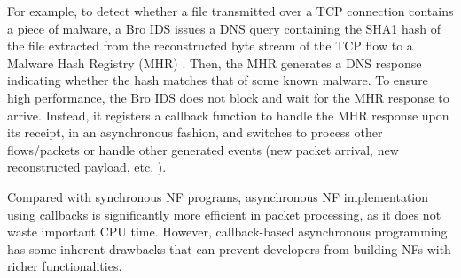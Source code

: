 
For example, to detect whether a file transmitted over a TCP connection contains a piece of malware, a Bro IDS \cite{bro} issues a DNS query containing the SHA1 hash \cite{sha1} of the file extracted from the reconstructed byte stream of the TCP flow to a Malware Hash Registry (MHR) \cite{MHR}. Then, the MHR generates a DNS response indicating whether the hash matches that of some known malware. To ensure high performance, the Bro IDS does not block and wait for the MHR response to arrive. Instead, it registers a callback function to handle the MHR response upon its receipt, in an asynchronous fashion, and switches to process other flows/packets or handle other generated events (new packet arrival, new reconstructed payload, etc. \cite{paxson1999bro}).

Compared with synchronous NF programs, asynchronous NF implementation using callbacks is significantly more efficient in packet processing, as it does not waste important CPU time. However, callback-based asynchronous programming has some inherent drawbacks that can prevent developers from building NFs with richer functionalities.

